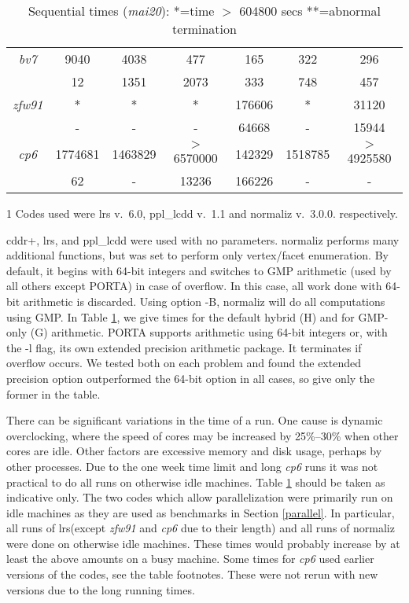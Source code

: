 \documentclass[a4paper,11pt]{article}   \usepackage{authblk} \usepackage[top=1.9cm,bottom=1.9cm,left=1.9cm,right=1.9cm]{geometry}
\newcommand{\progname}{\textsf}
\newcommand{\compname}{\emph}
\newcommand{\lrs}{\progname{lrs}\xspace}
\newcommand{\norm}{\progname{normaliz}\xspace}
\newcommand{\mait}{\compname{mai20}\xspace}
\newcommand{\cdd}{\progname{cddr+}\xspace}
\newcommand{\porta}{\progname{PORTA}\xspace}
\newcommand{\ppl}{\progname{ppl\_lcdd}\xspace}
\newcommand{\polytope}{\emph}
\newcommand{\bvseven}{\polytope{bv7}\xspace}
\newcommand{\cpsix}{\polytope{cp6}\xspace}
\newcommand{\zfw}{\polytope{zfw91}\xspace}
\begin{document}
\begin{table}[htb]
\begin{threeparttable}
{\begin{tabular}{|c||c||c||c||c|c||c|}
 \hline
\bvseven &  9040 & 4038  &  477  &     165     &       322    &  296  \\
         &  12   & 1351  & 2073  &     333     &       748    & 457   \\
 \hline
\zfw     &  *    &   *   &   *   &   176606    &       *      & 31120 \\
         &  -    &   -   &   -   &    64668    &       -      & 15944 \\
\hline
\cpsix   & 1774681\tnote{1}&1463829&$>$6570000\tnote{1} &     142329   &1518785\tnote{1} &  $>$4925580 \\
         &  62   &   -   & 13236 &    166226   &       -      &   -   \\
\hline
\end{tabular}
}
\begin{tablenotes}
\item[1]{Codes used were \lrs v.\ 6.0, \ppl v.\ 1.1 and \norm v.\ 3.0.0.} respectively.
\end{tablenotes}
\caption{{Sequential times (\mait):  *=time $>$ 604800 secs  **=abnormal termination}} \label{tab:single}
\end{threeparttable}
\end{table}

\cdd, \lrs, and \ppl were used with no parameters.
\norm performs many additional functions, but
was set to perform only vertex/facet enumeration.
By default, it begins with 64-bit integers
and switches to GMP arithmetic (used by all others except \porta) in case
of overflow. In this case, all work done with 64-bit arithmetic is discarded.
Using option -B, \norm will do all computations using GMP.
In Table \ref{tab:single}, we
give times for the default hybrid (H) and for GMP-only (G) arithmetic.
\porta supports arithmetic using 64-bit integers or,
with the -l flag,
its own extended precision arithmetic package.
It terminates if overflow occurs.
We tested both on each problem and found the extended precision
option outperformed the 64-bit option in all cases, so give only the former in the table.

There can be significant variations in the time
of a run.  One cause is dynamic overclocking, where the speed of cores may be increased
by 25\%--30\% when other cores are idle.
Other factors are excessive memory and disk usage,
perhaps by other processes.
Due to the one week time limit and
long \cpsix runs it was not practical to do all runs on otherwise idle machines.
Table \ref{tab:single} should be taken as indicative only.
The two codes which allow parallelization were primarily run on idle
machines
as they are used as benchmarks in Section \ref{parallel}.
In particular, all runs of \lrs (except \zfw and \cpsix due to their length) and all
runs of \norm were
done on otherwise idle machines. These times would
probably increase
by at least the above amounts on a busy machine.
Some times for \cpsix used earlier versions of the
codes, see the table footnotes.
These were not rerun with new versions due to the long running times.
\end{document}
